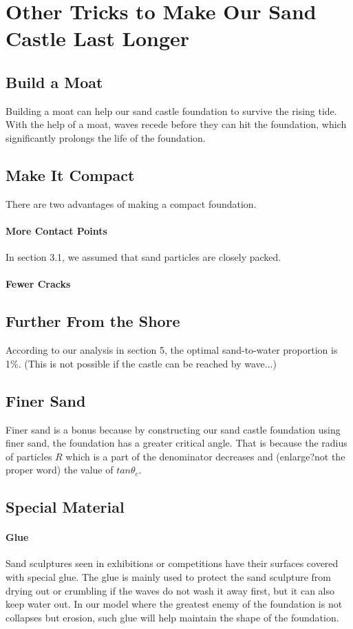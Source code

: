 \documentclass[12pt]{article}
\begin{document}
\section{Other Tricks to Make Our Sand Castle Last Longer}
\subsection{Build a Moat}
Building a moat can help our sand castle foundation to survive the rising tide. With the help of a moat, waves recede before they can hit the foundation, which significantly prolongs the life of the foundation.
\subsection{Make It Compact}
There are two advantages of making a compact foundation. 
\paragraph{More Contact Points}
In section 3.1, we assumed that sand particles are closely packed. 
\paragraph{Fewer Cracks}
\subsection{Further From the Shore}
According to our analysis in section 5, the optimal sand-to-water proportion is 1\%.
(This is not possible if the castle can be reached by wave...)
\subsection{Finer Sand}
Finer sand is a bonus because by constructing our sand castle foundation using finer sand, the foundation has a greater critical angle. That is because the radius of particles $R$ which is a part of the denominator decreases and (enlarge?not the proper word) the value of $tan\theta_c$.
\subsection{Special Material}
\paragraph{Glue}
Sand sculptures seen in exhibitions or competitions have their surfaces covered with special glue. The glue is mainly used to protect the sand sculpture from drying out or crumbling if the waves do not wash it away first, but it can also keep water out. In our model where the greatest enemy of the foundation is not collapses but erosion, such glue will help maintain the shape of the foundation.
\end{document}
